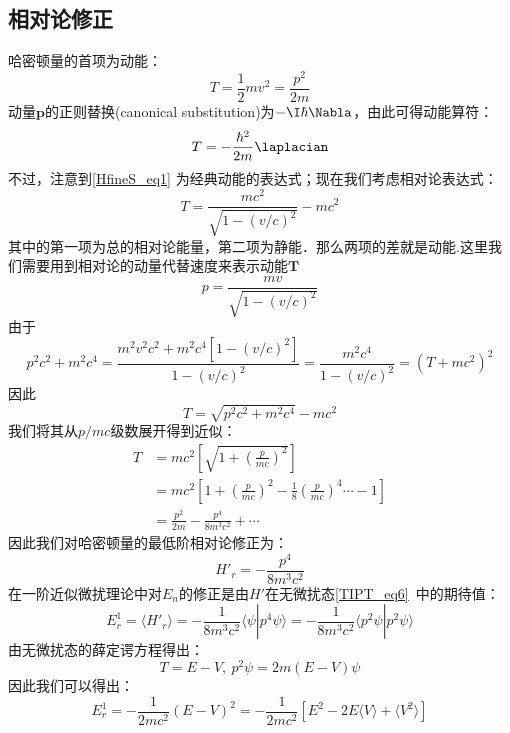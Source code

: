 \subsection{相对论修正}
哈密顿量的首项为动能：
\begin{equation}\label{HfineS_eq1}
T=\frac{1}{2}mv^2=\frac{p^2}{2m}
\end{equation}
动量$\mathbf p$的正则替换(canonical substitution)为$-\I\hbar\Nabla$，由此可得动能算符：
\begin{equation}
T=-\frac{\hbar^2}{2m}\laplacian
\end{equation}
不过，注意到\autoref{HfineS_eq1} 为经典动能的表达式；现在我们考虑相对论表达式：
\begin{equation}
T=\frac{mc^2}{\sqrt{1-(v/c)^2}}-mc^2
\end{equation}
其中的第一项为总的相对论能量，第二项为静能．那么两项的差就是动能.这里我们需要用到相对论的动量代替速度来表示动能$\mathbf T$
\begin{equation}
p=\frac{mv}{\sqrt{1-(v/c)^2}}
\end{equation}
由于
\begin{equation}
p^2c^2+m^2c^4=\frac{m^2v^2c^2+m^2c^4[1-(v/c)^2]}{1-(v/c)^2}=\frac{m^2c^4}{1-(v/c)^2}=(T+mc^2)^2
\end{equation}
因此
\begin{equation}
T=\sqrt{p^2c^2+m^2c^4}-mc^2
\end{equation}
我们将其从$p/mc$级数展开得到近似：
\begin{align}
T &= mc^2\left[\sqrt{1+\left(\frac{p}{mc}\right)^2}\right]\\ 
&=mc^2\left[1+\left(\frac{p}{mc}\right)^2-\frac{1}{8}\left(\frac{p}{mc}\right)^4\cdots -1\right]\\
&=\frac{p^2}{2m}-\frac{p^4}{8m^3c^2}+\cdots
\end{align}
因此我们对哈密顿量的最低阶相对论修正为：
\begin{equation}
H'_r=-\frac{p^4}{8m^3c^2}
\end{equation}
在一阶近似微扰理论中对$E_n$的修正是由$H'$在无微扰态\autoref{TIPT_eq6}~中的期待值：
\begin{equation}\label{HfineS_eq16}
E_r^1=\langle H'_r\rangle=-\frac{1}{8m^3c^2}\langle\psi|p^4\psi\rangle=-\frac{1}{8m^3c^2}\langle p^2\psi|p^2\psi\rangle
\end{equation}
由无微扰态的薛定谔方程得出：
\begin{equation}
T=E-V, \ p^2\psi = 2m(E-V)\psi
\end{equation}
因此我们可以得出：
\begin{equation}
E_r^1=-\frac{1}{2mc^2}(E-V)^2=-\frac{1}{2mc^2}[E^2-2E\langle V\rangle+\langle V^2\rangle]
\end{equation}
